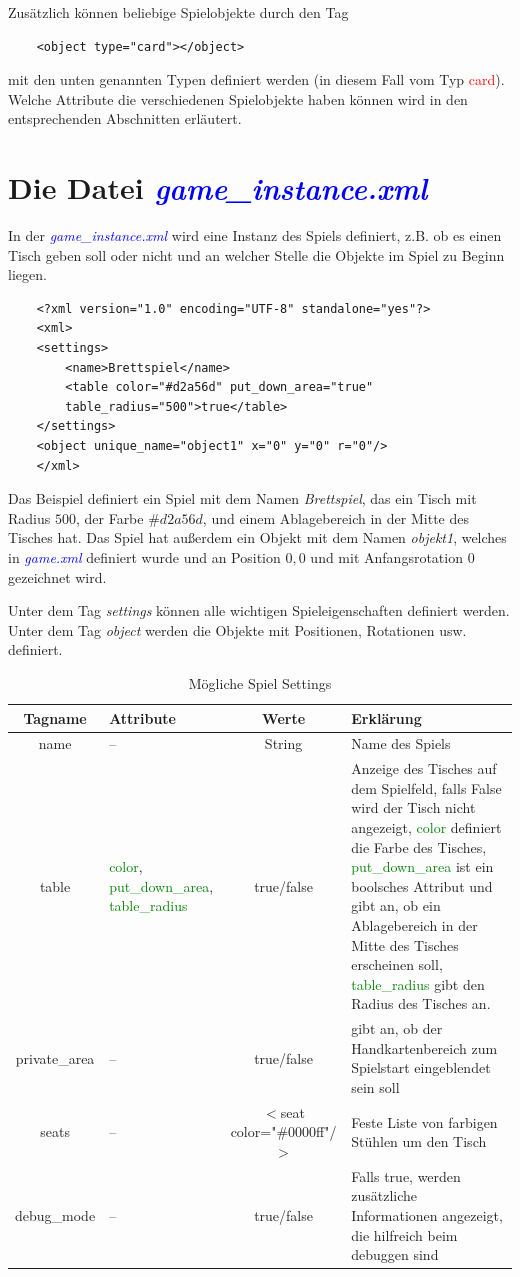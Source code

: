 \documentclass[ngerman]{scrbook}
\newcommand{\gamefile}[1]{\textit{\textcolor{blue}{#1}}\xspace}
\newcommand{\game}{\gamefile{game.xml}}
\newcommand{\gameinstance}{\gamefile{game\_instance.xml}}
\newcommand{\card}{\textcolor{red}{card}\xspace}
\newcommand{\xmlattribute}[1]{\textcolor{green}{#1}}
\begin{document}
	Zusätzlich können beliebige Spielobjekte durch den Tag \lstset{language=XML}
	\begin{lstlisting}
	<object type="card"></object>
	\end{lstlisting}  mit den unten genannten Typen definiert werden (in diesem Fall vom Typ \card). Welche Attribute die verschiedenen Spielobjekte haben können wird in den entsprechenden Abschnitten erläutert.

	\section{Die Datei \gameinstance}
	In der \gameinstance wird eine Instanz des Spiels definiert, z.B. ob es einen Tisch geben soll oder nicht und an welcher Stelle die Objekte im Spiel zu Beginn liegen.
	
	\lstset{language=XML}
	\begin{lstlisting}	
	<?xml version="1.0" encoding="UTF-8" standalone="yes"?>
	<xml>
	<settings>
		<name>Brettspiel</name>
		<table color="#d2a56d" put_down_area="true"
		table_radius="500">true</table>
	</settings>
	<object unique_name="object1" x="0" y="0" r="0"/>
	</xml>
	\end{lstlisting}
	
	Das Beispiel definiert ein Spiel mit dem Namen \textit{Brettspiel}, das ein Tisch mit Radius $500$, der Farbe $\#d2a56d$, und einem Ablagebereich in der Mitte des Tisches hat. Das Spiel hat außerdem ein Objekt mit dem Namen \textit{objekt1}, welches in \game definiert wurde und an Position $0, 0$ und mit Anfangsrotation $0$ gezeichnet wird.
	
	Unter dem Tag \textit{settings} können alle wichtigen Spieleigenschaften definiert werden. Unter dem Tag \textit{object} werden die Objekte mit Positionen, Rotationen usw. definiert.
	
	\begin{table}[!h]
		\centering
		\renewcommand{\arraystretch}{1.5}
		\begin{tabularx}{\textwidth}{c|X|c|X}
			Tagname & Attribute & Werte & Erklärung\\\hline
			
			name & -- & String & Name des Spiels\\
			table & \xmlattribute{color}, \xmlattribute{put\_down\_area}, \xmlattribute{table\_radius} & true/false & Anzeige des Tisches auf dem Spielfeld, falls False wird der Tisch nicht angezeigt, \xmlattribute{color} definiert die Farbe des Tisches, \xmlattribute{put\_down\_area} ist ein boolsches Attribut und gibt an, ob ein Ablagebereich in der Mitte des Tisches erscheinen soll, \xmlattribute{table\_radius} gibt den Radius des Tisches an.\\
			private\_area & -- & true/false & gibt an, ob der Handkartenbereich zum Spielstart eingeblendet sein soll\\
			seats & -- & $<$seat color="\#0000ff"/$>$ & Feste Liste von farbigen Stühlen um den Tisch\\
			debug\_mode & -- & true/false & Falls true, werden zusätzliche Informationen angezeigt, die hilfreich beim debuggen sind\\
		\end{tabularx}
	\caption{Mögliche Spiel Settings}
	\end{table}
\end{document}
